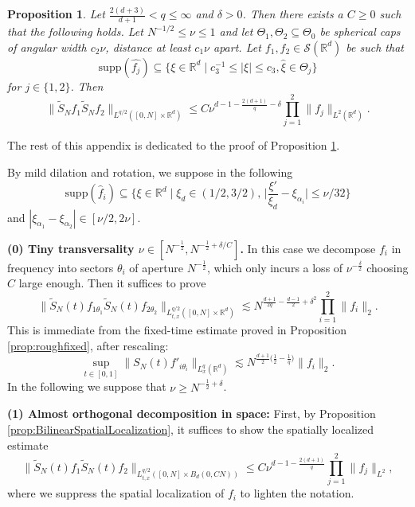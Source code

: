 \documentclass{amsart}
\numberwithin{equation}{section}
\newtheorem{proposition}[theorem]{Proposition}
\theoremstyle{definition}
\newcommand{\R}{\mathbb{R}}
\newcommand{\Rd}{\mathbb{R}^{d}}
\newcommand {\Sw}{\mathcal{S}}
\newcommand {\supp}{\mathrm{supp}}
\newcommand {\wh}{\widehat}
\begin{document}
\begin{proposition}\label{prop:SharpBilinearEstimate}
Let $\frac{2(d+3)}{d+1}<q\leq \infty$ and $\delta>0$. %
Then there exists a $C\geq0$ such that the following holds. Let $N^{-1/2}\leq \nu\leq 1$ and let $\Theta_{1},\Theta_{2}\subseteq \Theta_{0}$ be spherical caps of angular width $c_{2}\nu$, distance at least $c_{1}\nu$ apart. Let $f_{1},f_{2}\in\Sw(\Rd)$ be such that  
\[
\supp(\wh{f_{j}})\subseteq \{ \xi \in \R^d \mid c_{3}^{-1}\leq |\xi|\leq c_{3}, \hat{\xi}\in\Theta_{j}\}   
\]
for $j\in\{1,2\}$. Then 
\[
\| \tilde{S}_N  f_1 \tilde{S}_N f_2 \|_{L^{q/2}([0,N] \times \R^d)} \leq C\nu^{d-1-\frac{2(d+1)}{q}-\delta} \prod_{j=1}^2 \| f_j \|_{L^{2}(\Rd)}.
\]
\end{proposition}

The rest of this appendix is dedicated to the proof of Proposition \ref{prop:SharpBilinearEstimate}.

By mild dilation and rotation, we suppose in the following
\begin{equation*}
\text{supp}(\widehat{f}_{i}) \subseteq \{ \xi \in \R^d \mid \xi_d \in (1/2,3/2), \, \big| \frac{\xi'}{\xi_d} - \xi_{\alpha_i} \big| \leq \nu/32 \}
\end{equation*}
and $|\xi_{\alpha_1} - \xi_{\alpha_2}| \in [ \nu/2,2\nu] $.

\textbf{(0) Tiny transversality $\nu \in [N^{-\frac{1}{2}}, N^{-\frac{1}{2}+\delta/C}]$.}
In this case we decompose $f_i$ in frequency into sectors $\theta_i$ of aperture $N^{-\frac{1}{2}}$, which only incurs a loss of $\nu^{-\frac{\delta}{2}}$ choosing $C$ large enough. Then it suffices to prove
\begin{equation*}
\| \tilde{S}_N(t) f_{1 \theta_1} \tilde{S}_N(t) f_{2 \theta_2} \|_{L^{q/2}_{t,x}([0,N] \times \R^d)} \lesssim N^{\frac{d+1}{2q}-\frac{d-1}{2}+\delta^2} \prod_{i=1}^2 \| f_i \|_2.
\end{equation*}
This is immediate from the fixed-time estimate proved in Proposition \ref{prop:roughfixed}, after rescaling:
\begin{equation*}
\sup_{t \in [0,1]} \| S_N(t) f'_{i \theta_i} \|_{L^{q}_{x}(\R^d)} \lesssim N^{\frac{d+1}{2} \big( \frac{1}{2} -\frac{1}{q}\big)} \| f_i \|_2.
\end{equation*}
In the following we suppose that $\nu \geq N^{-\frac{1}{2}+\delta}$.

\smallskip

\textbf{(1) Almost orthogonal decomposition in space:}
First, by Proposition \ref{prop:BilinearSpatialLocalization}, it suffices to show the spatially localized estimate
\begin{equation*}
    \| \tilde{S}_N(t) f_1 \tilde{S}_N(t) f_2 \|_{L^{q/2}_{t,x}([0,N] \times B_d(0,CN))} \leq C \nu^{d-1-\frac{2(d+1)}{q}} \prod_{j=1}^2 \| f_j \|_{L^2},
\end{equation*}
where we suppress the spatial localization of $f_i$ to lighten the notation.
\end{document}
